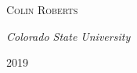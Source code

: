 \begin{titlepage}
	{\scshape\Large Colin Roberts \\} %
	
	\vspace{0.5\baselineskip} %
	
	\textit{Colorado State University} %
	
	\vfill %
	
	
	
	\vspace{0.3\baselineskip} %
	
	2019 %
	

\end{titlepage}